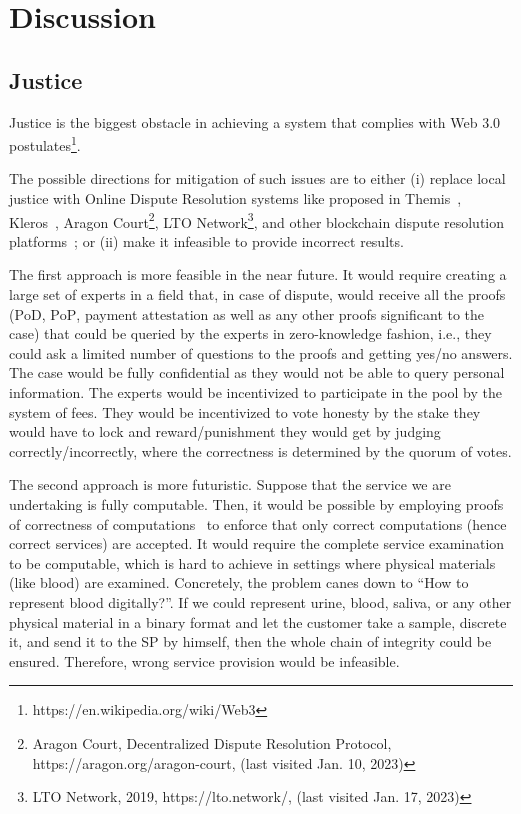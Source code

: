 \documentclass{ieeeaccess}
\begin{document}
\section{Discussion}
\label{sec:discussion}

\subsection{Justice}\label{sec:decentralised-justice}

Justice is the biggest obstacle in achieving a system that complies with Web 3.0 postulates\footnote{https://en.wikipedia.org/wiki/Web3}.

The possible directions for mitigation of such issues are to either (i) replace local justice with Online Dispute Resolution systems like proposed in Themis~\cite{mengThemisDecentralizedEscrow2019}, Kleros~\cite{bergollaKlerosSociolegalCase2022,gudkovCrowdArbitrationBlockchain2020}, Aragon Court\footnote{Aragon Court, Decentralized Dispute Resolution Protocol, https://aragon.org/aragon-court, (last visited Jan. 10, 2023)}, LTO Network\footnote{LTO Network, 2019, https://lto.network/, (last visited Jan. 17, 2023)}, and other blockchain dispute resolution platforms~\cite{allenGovernanceBlockchainDispute2019}; or (ii) make it infeasible to provide incorrect results.

The first approach is more feasible in the near future. It would require creating a large set of experts in a field that, in case of dispute, would receive all the proofs ($\mathrm{PoD}$, $\mathrm{PoP}$, payment $\mathrm{attestation}$ as well as any other proofs significant to the case) that could be queried by the experts in zero-knowledge fashion, i.e., they could ask a limited number of questions to the proofs and getting yes/no answers. The case would be fully confidential as they would not be able to query personal information. The experts would be incentivized to participate in the pool by the system of fees. They would be incentivized to vote honesty by the stake they would have to lock and reward/punishment they would get by judging correctly/incorrectly, where the correctness is determined by the quorum of votes.

The second approach is more futuristic. Suppose that the service we are undertaking is fully computable. Then, it would be possible by employing proofs of correctness of computations~\cite{ben-sassonSNARKsVerifyingProgram2013} to enforce that only correct computations (hence correct services) are accepted. It would require the complete service examination to be computable, which is hard to achieve in settings where physical materials (like blood) are examined. Concretely, the problem canes down to ``How to represent blood digitally?''. If we could represent urine, blood, saliva, or any other physical material in a binary format and let the customer take a sample, discrete it, and send it to the SP by himself, then the whole chain of integrity could be ensured. Therefore, wrong service provision would be infeasible.
\end{document}
